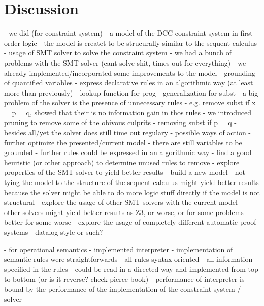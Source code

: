\chapter{Discussion}

- we did (for constraint system)
  - a model of the DCC constraint system in first-order logic
  - the model is createt to be strucurally similar to the sequent calculus
  - usage of SMT solver to solve the constraint system
  - we had a bunch of problems with the SMT solver (cant solve shit, times out for everything)
  - we already implemented/incorporated some improvements to the model
    - grounding of quantified variables
    - express declarative rules in an algorithmic way (at least more than previously)
      - lookup function for prog
      - generalization for subst
  - a big problem of the solver is the presence of unnecessary rules
    - e.g. remove subst if x = p = q, showed that their is no information gain in thos rules
    - we introduced pruning to remove some of the obivous culprits
    - removing subst if p = q
  - besides all/yet the solver does still time out regulary
  - possible ways of action
    - further optimize the presented/current model
      - there are still variables to be grounded
      - further rules could be expressed in an algorithmic way
      - find a good heuristic (or other approach) to determine unused rules to remove
      - explore properties of the SMT solver to yield better results
    - build a new model
      - not tying the model to the structure of the sequent calculus might yield better results
        because the solver might be able to do more logic stuff directly if the model is not structural
    - explore the usage of other SMT solvers with the current model
      - other solvers might yield better results as Z3,
        or worse, or for some problems better for some worse
    - explore the usage of completely different automatic proof systems
      - datalog style or such?

- for operational semantics
  - implemented interpreter
  - implementation of semantic rules were straightforwards
  - all rules syntax oriented
  - all information specified in the rules
  - could be read in a directed way and implemented from top to bottom (or is it reverse? check pierce book)
  - performance of interpreter is bound by the performance of the implementation of the constraint system / solver

